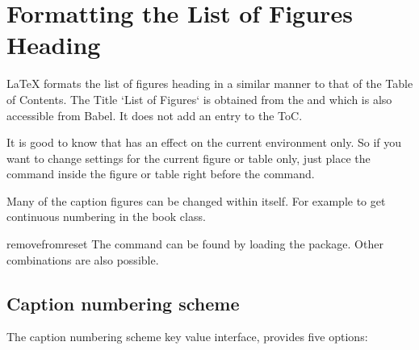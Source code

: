 \section{Formatting the List of Figures Heading}

LaTeX formats the list of figures heading in a similar manner to that of the Table of Contents. The Title `List of Figures` is obtained from the  and which is also accessible from Babel. It does not add an entry to the ToC.



It is good to know that  has an effect on the current environment only.
So if you want to change settings for the current figure or table only, just place the
 command inside the figure or table right before the 
command.


Many of the caption figures can be changed within \latexe itself. For example to get continuous numbering in the book class.

\begin{teXXX}
\makeatletter
{}
\renewcommand{\thetable}{\arabic{table}}
\makeatother
\end{teXXX}

\begin{docCommand}{removefromreset}{}
The command  can be found by loading the  package. Other combinations are also possible.
\end{docCommand}

\subsection{Caption numbering scheme}

The caption numbering scheme key value interface, provides five
options: 
\medskip

